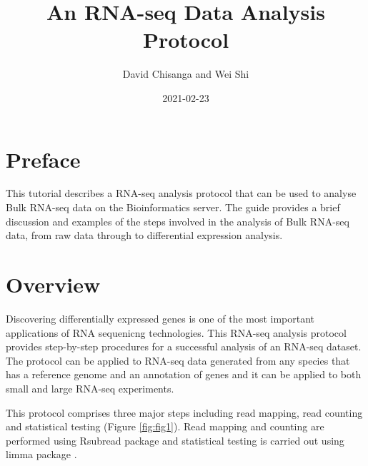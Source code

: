 \documentclass[]{book}
\title{An RNA-seq Data Analysis Protocol}
\author{David Chisanga and Wei Shi}
\date{2021-02-23}
\begin{document}
\maketitle

{
\setcounter{tocdepth}{1}
\tableofcontents
}
\hypertarget{preface}{%
\chapter*{Preface}\label{preface}}

This tutorial describes a RNA-seq analysis protocol that can be used to analyse Bulk RNA-seq data on the Bioinformatics server. The guide provides a brief discussion and examples of the steps involved in the analysis of Bulk RNA-seq data, from raw data through to differential expression analysis.

\hypertarget{intro}{%
\chapter{Overview}\label{intro}}

Discovering differentially expressed genes is one of the most important applications of RNA sequenicng technologies. This RNA-seq analysis protocol provides step-by-step procedures for a successful analysis of an RNA-seq dataset. The protocol can be applied to RNA-seq data generated
from any species that has a reference genome and an annotation of genes and it can be applied to both small and large RNA-seq experiments.

This protocol comprises three major steps including read mapping, read counting and statistical testing (Figure \ref{fig:fig1}). Read mapping and counting are performed using Rsubread package \citep{Rsubread2019} and statistical testing is carried out using limma package \citep{limma2015}.
\end{document}
